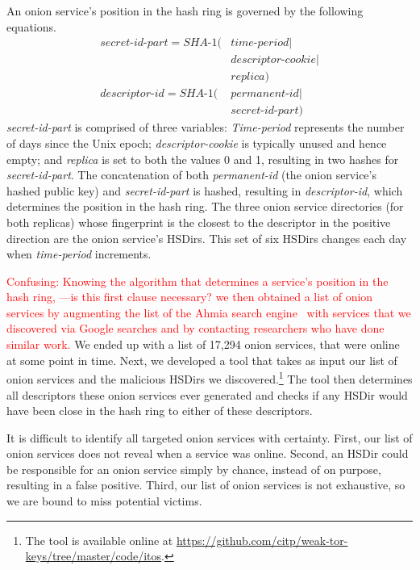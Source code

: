 An onion service's position in the hash ring is governed by
the following equations.
\begin{equation}
\begin{split}
\textit{secret-id-part} = \textit{SHA-1}(& \textit{time-period} \mid \\
                                         & \textit{descriptor-cookie} \mid \\
                                         & \textit{replica}) \\
\textit{descriptor-id} =  \textit{SHA-1}(& \textit{permanent-id} \mid \\
                                         & \textit{secret-id-part})
\end{split}
\end{equation}
\textit{secret-id-part} is comprised of three variables:  \textit{Time-period}
represents the number of days since the Unix epoch; \textit{descriptor-cookie}
is typically unused and hence empty; and \textit{replica} is set to both the
values 0 and 1, resulting in two hashes for \textit{secret-id-part}.  
The concatenation of both \textit{permanent-id} (the onion service's hashed
public key) and \textit{secret-id-part} is hashed, resulting in
\textit{descriptor-id}, which determines the position in the hash ring.  The
three onion service directories (for both replicas) whose fingerprint is the
closest to the descriptor in the positive direction are the onion service's HSDirs.
This set of six HSDirs changes each day when \textit{time-period} increments.

\textcolor{red}{Confusing: Knowing the algorithm that determines a service's position in the hash ring,
---is this first clause necessary? 
we then obtained a list of onion services by augmenting the list of the Ahmia
search engine~\cite{ahmia} with services that we discovered via Google searches
and by contacting researchers who have done similar work.}  We ended up with a
list of 17,294 onion services, that were online at some point in time.  Next, we
developed a tool that takes as input our list of onion services and the
malicious HSDirs we discovered.\footnote{The tool is available online at
\url{https://github.com/citp/weak-tor-keys/tree/master/code/itos}.}  The tool
then determines all descriptors these onion services ever generated and checks
if any HSDir would have been close in the hash ring to either of these
descriptors. 

It is difficult to identify all targeted onion services with
certainty.  First, our list of onion services does not reveal when a service was
online.  Second, an HSDir could be responsible for an onion service simply by
chance, instead of on purpose, resulting in a false positive.  Third, our list
of onion services is not exhaustive, so we are bound to miss potential victims.


